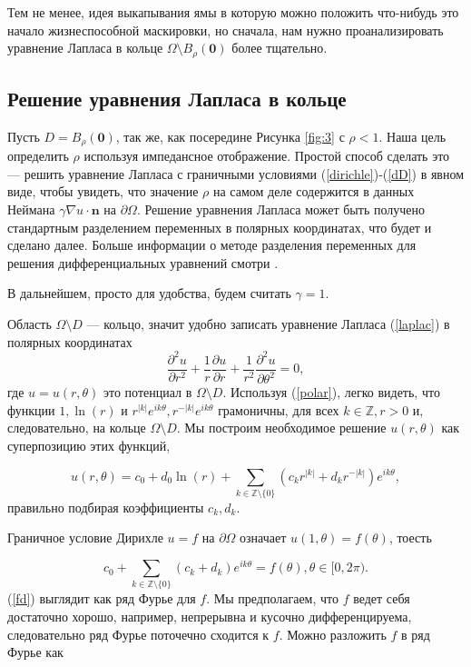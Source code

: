 \documentclass[a4paper, 12pt]{article}
\begin{document}
Тем не менее, идея выкапывания ямы в которую можно положить что-нибудь это начало 
жизнеспособной маскировки,
но сначала, нам нужно проанализировать уравнение Лапласа в кольце $\Omega \setminus 
B_{\rho}(\textbf{0})$
более тщательно.

\subsection{Решение уравнения Лапласа в кольце}
Пусть $D = B_{\rho}(\textbf{0})$, так же, как посередине Рисунка \ref{fig:3} с $\rho < 
1$. Наша цель
определить $\rho$ используя импедансное отображение. Простой способ сделать это --- 
решить уравнение Лапласа
с граничными условиями (\ref{dirichle})-(\ref{dD}) в явном виде, чтобы увидеть, что 
значение $\rho$ на самом
деле содержится в данных Неймана $\gamma \nabla u \cdot \textbf{n}$ на $\partial 
\Omega$. Решение уравнения
Лапласа может быть получено стандартным разделением переменных в полярных координатах, 
что будет и сделано
далее. Больше информации о методе разделения переменных для решения дифференциальных 
уравнений смотри \cite{27}.


В дальнейшем, просто для удобства, будем считать $\gamma = 1$.


Область $\Omega \setminus D$ --- кольцо, значит удобно записать уравнение Лапласа 
(\ref{laplac}) в полярных
координатах
\begin{equation}\label{polar}
\frac{\partial^2 u}{\partial r^2} + \frac{1}{r} \frac{\partial u}{\partial r} + 
\frac{1}{r^2}\frac{\partial^2 u}{\partial \theta^2} = 0,
\end{equation}
где $u = u(r, \theta)$ это потенциал в $\Omega \setminus D$. Используя (\ref{polar}), 
легко видеть, что
функции $1, \ln(r)$ и $r^{|k|} e^{ik\theta}, r^{-|k|}e^{ik\theta}$ грамоничны, для 
всех $k \in \mathbb{Z}, r
> 0$ и, следовательно, на кольце $\Omega \setminus D$. Мы построим необходимое решение 
$u(r, \theta)$ как
суперпозицию этих функций,

\begin{equation}\label{sol}
u(r, \theta) = c_0 + d_0\ln(r) + \sum\limits_{k \in \mathbb{Z} \setminus \{0\}}{(c_k 
r^{|k|} + d_k r^{-|k|})
e^{ik\theta}},
\end{equation}
правильно подбирая коэффициенты $c_k, d_k$.


Граничное условие Дирихле $u = f$ на $\partial \Omega$ означает $u(1, \theta) = 
f(\theta)$, тоесть

\begin{equation}\label{fd}
c_0 + \sum_{k \in \mathbb{Z} \setminus \{0\}}{(c_k + d_k)e^{ik\theta}} = f(\theta), 
\theta \in [0, 2\pi).
\end{equation}
(\ref{fd}) выглядит как ряд Фурье для $f$. Мы предполагаем, что $f$ ведет себя 
достаточно хорошо, например,
непрерывна и кусочно дифференцируема, следовательно ряд Фурье поточечно сходится к 
$f$. Можно разложить $f$ в ряд Фурье как
\end{document}
